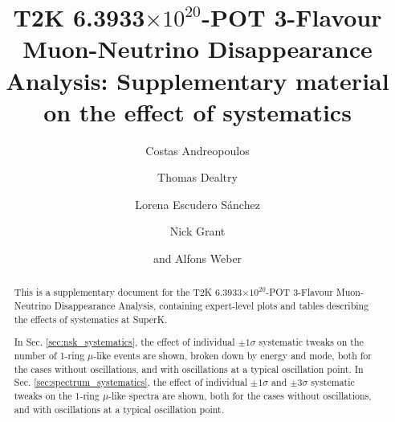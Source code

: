 %
%

\begin{frontmatter}

\title{
  T2K 6.3933$\times10^{20}$-POT 3-Flavour Muon-Neutrino Disappearance Analysis:
  Supplementary material on the effect of systematics
}

\vspace*{0.7cm}

\author[RAL]     {Costas Andreopoulos}
\author[RAL,OXF] {Thomas Dealtry}
\author[IFIC]    {Lorena Escudero S\'anchez}
\author[LANCS]   {Nick Grant}
\author[RAL,OXF] {and Alfons Weber}

\address[RAL]{Particle Physics Dept., Rutherford Appleton Laboratory, STFC \\
              Harwell Oxford Campus\\
              Oxfordshire OX11 0QX, UK}

\address[OXF]{Subdepartment of Particle Physics, University of Oxford \\
              Denys Wilkinson Building, Keble Road\\
              Oxfordshire OX1 3RH, UK}

\address[IFIC]{Instituto de Fisica Corpuscular\\
              CSIC and University of Valencia\\
              Valencia, Spain}

\address[LANCS]{Physics Dept., Lancaster University \\
              Lancaster, LA1 4YB, UK}

%
%

\begin{abstract}

  This is a supplementary document for the T2K 6.3933$\times10^{20}$-POT 3-Flavour Muon-Neutrino Disappearance Analysis,
  containing expert-level plots and tables describing the effects of systematics at SuperK.

  In Sec. \ref{sec:nsk_systematics}, the effect of individual $\pm1\sigma$ systematic tweaks on the number of 1-ring $\mu$-like
  events are shown, broken down by energy and mode, both for the cases
  without oscillations, and with oscillations at a typical oscillation point.
  In Sec. \ref{sec:spectrum_systematics}, the effect of individual $\pm1\sigma$ and $\pm3\sigma$ systematic tweaks on the 1-ring $\mu$-like spectra
  are shown, both for the cases
  without oscillations, and with oscillations at a typical oscillation point.

\end{abstract}

%
%


\end{frontmatter}

\clearpage

\tableofcontents

\clearpage

\listoffigures
\listoftables


